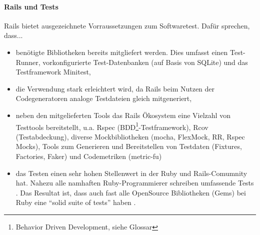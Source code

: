 \paragraph{Rails und Tests}
Rails bietet ausgezeichnete Vorraussetzungen zum Softwaretest. Dafür sprechen, dass...

\begin{itemize}
 \item benötigte Bibliotheken bereits mitgliefert werden. Dies umfasst einen Test-Runner, vorkonfigurierte Test-Datenbanken (auf Basis von SQLite) und das Testframework Minitest,
 \item die Verwendung stark erleichtert wird, da Rails beim Nutzen der Codegeneratoren analoge Testdateien gleich mitgeneriert,
 \item neben den mitgelieferten Tools das Rails Ökosystem eine Vielzahl von Testtools bereitstellt, u.a. Rspec (BDD\footnote{Behavior Driven Development, siehe Glossar}-Testframework), Rcov (Testabdeckung), diverse Mockbibliotheken (mocha, FlexMock, RR, Rspec Mocks), Tools zum Generieren und Bereitstellen von Testdaten (Fixtures, Factories, Faker) und Codemetriken (metric-fu)
 \item das Testen einen sehr hohen Stellenwert in der Ruby und Rails-Comumnity hat. Nahezu alle namhaften Ruby-Programmierer schreiben umfassende Tests \citep{devries_rails_2008}. Das Resultat ist, dass auch fast alle OpenSource Bibliotheken (Gems) bei Ruby eine "`solid suite of tests"' haben \citep{devries_rails_2008}. 
\end{itemize}

